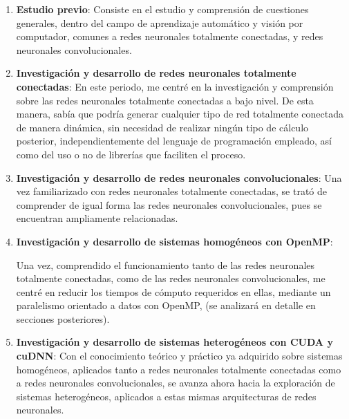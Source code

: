 \begin{enumerate}[label=\textbullet]
	\item \textbf{Estudio previo}: Consiste en el estudio y comprensión de cuestiones generales, dentro del campo de aprendizaje automático y visión por computador, comunes a redes neuronales totalmente conectadas, y redes neuronales convolucionales.
	
	\item \textbf{Investigación y desarrollo de redes neuronales totalmente conectadas}: En este periodo, me centré en la investigación y comprensión sobre las redes neuronales totalmente conectadas a bajo nivel. De esta manera, sabía que podría generar cualquier tipo de red totalmente conectada de manera dinámica, sin necesidad de realizar ningún tipo de cálculo posterior, independientemente del lenguaje de programación empleado, así como del uso o no de librerías que faciliten el proceso. 
	
	\item \textbf{Investigación y desarrollo de redes neuronales convolucionales}:
	Una vez familiarizado con redes neuronales totalmente conectadas, se trató de comprender de igual forma las redes neuronales convolucionales, pues se encuentran ampliamente relacionadas.
	\item \textbf{Investigación y desarrollo de sistemas homogéneos con OpenMP}:
	
	Una vez, comprendido el funcionamiento tanto de las redes neuronales totalmente conectadas, como de las redes neuronales convolucionales, me centré en reducir los tiempos de cómputo requeridos en ellas, mediante un paralelismo orientado a datos con OpenMP, (se analizará en detalle en secciones posteriores).
	
	\item \textbf{Investigación y desarrollo de sistemas heterogéneos con CUDA y cuDNN}:
	Con el conocimiento teórico y práctico ya adquirido sobre sistemas homogéneos, aplicados tanto a redes neuronales totalmente conectadas como a redes neuronales convolucionales, se avanza ahora hacia la exploración de sistemas heterogéneos, aplicados a estas mismas arquitecturas de redes neuronales.
\end{enumerate}



